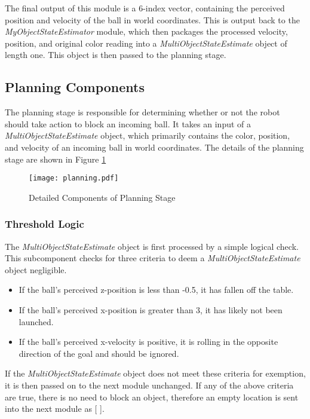 \documentclass{article}
\begin{document}
The final output of this module is a 6-index vector, containing the perceived position and velocity of the ball in world coordinates. This is output back to the \emph{MyObjectStateEstimator} module, which then packages the processed velocity, position, and original color reading into a \emph{MultiObjectStateEstimate} object of length one. This object is then passed to the planning stage.



\subsection{Planning Components} \label{sec:planningcomp}
The planning stage is responsible for determining whether or not the robot should take action to block an incoming ball. It takes an input of a \emph{MultiObjectStateEstimate} object, which primarily contains the color, position, and velocity of an incoming ball in world coordinates. The details of the planning stage are shown in Figure \ref{fig:planning}

\begin{figure}[h]
\begin{center}
\texttt{[image: planning.pdf]}
\caption{\label{fig:planning} Detailed Components of Planning Stage}
\end{center}
\end{figure}

\subsubsection*{Threshold Logic}
The \emph{MultiObjectStateEstimate} object is first processed by a simple logical check. This subcomponent checks for three criteria to deem a \emph{MultiObjectStateEstimate} object negligible.
\begin{itemize}
\item If the ball's perceived z-position is less than -0.5, it has fallen off the table.
\item If the ball's perceived x-position is greater than 3, it has likely not been launched.
\item If the ball's perceived x-velocity is positive, it is rolling in the opposite direction of the goal and should be ignored.
\end{itemize}
If the \emph{MultiObjectStateEstimate} object does not meet these criteria for exemption, it is then passed on to the next module unchanged. If any of the above criteria are true, there is no need to block an object, therefore an empty location is sent into the next module as [ ].
\end{document}
